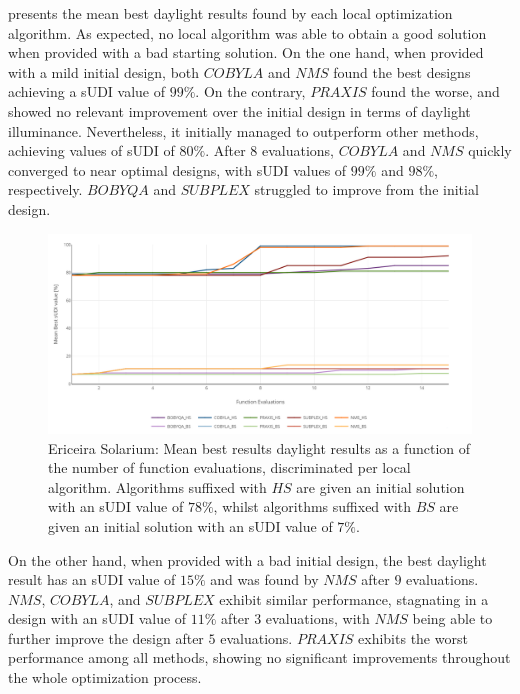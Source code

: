  presents the mean best daylight results found by each local optimization algorithm. As expected, no local algorithm was able to obtain a good solution when provided with a bad starting solution. On the one hand, when provided with a mild initial design, both $COBYLA$ and $NMS$ found the best designs achieving a \ac{sUDI} value of $99\%$. On the contrary, $PRAXIS$ found the worse, and showed no relevant improvement over the initial design in terms of daylight illuminance. Nevertheless, it initially managed to outperform other methods, achieving values of \ac{sUDI} of $80\%$. After $8$ evaluations, $COBYLA$ and $NMS$ quickly converged to near optimal designs, with \ac{sUDI} values of $99\%$ and $98\%$, respectively. $BOBYQA$ and $SUBPLEX$ struggled to improve from the initial design.
\begin{figure}[htbp]
	\centering
	\includegraphics[width=\textwidth]{Images/Evaluation/Ericeira_results_ph2.PNG}
	\caption[Ericeira Solarium: Mean best results of daylight performance in function of the number of evaluations, discriminated per local algorithm]{Ericeira Solarium: Mean best results daylight results as a function of the number of function evaluations, discriminated per local algorithm. Algorithms suffixed with $HS$ are given an initial solution with an \ac{sUDI} value of $78\%$, whilst algorithms suffixed with $BS$ are given an initial solution with an \ac{sUDI} value of $7\%$.}
	\label{fig:phase2results}
\end{figure}

On the other hand, when provided with a bad initial design, the best daylight result has an \ac{sUDI} value of $15\%$ and was found by $NMS$ after $9$ evaluations. $NMS$, $COBYLA$, and $SUBPLEX$ exhibit similar performance, stagnating in a design with an \ac{sUDI} value of $11\%$ after $3$ evaluations, with $NMS$ being able to further improve the design after $5$ evaluations. $PRAXIS$ exhibits the worst performance among all methods, showing no significant improvements throughout the whole optimization process.


